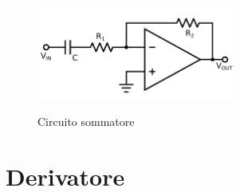 \begin{figure}
	\caption{Circuito sommatore}
	\includegraphics[width=65mm]{ccder.pdf}
	\label{fig:ccsum}
\end{figure}

\section{Derivatore}
